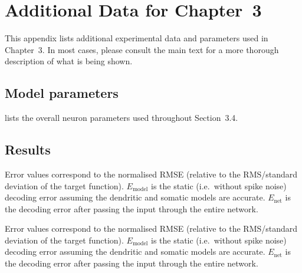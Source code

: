\section{Additional Data for Chapter~3}

This appendix lists additional experimental data and parameters used in Chapter~3.
In most cases, please consult the main text for a more thorough description of what is being shown.

\subsection{Model parameters}

 lists the overall neuron parameters used throughout Section~3.4.




\subsection{Results}
\label{app:two_comp_lif_results}

Error values correspond to the normalised RMSE (relative to the RMS/standard deviation of the target function). $E_\mathrm{model}$ is the static (i.e.~without spike noise) decoding error assuming the dendritic and somatic models are accurate. $E_\mathrm{net}$ is the decoding error after passing the input through the entire network.

Error values correspond to the normalised RMSE (relative to the RMS/standard deviation of the target function). $E_\mathrm{model}$ is the static (i.e.~without spike noise) decoding error assuming the dendritic and somatic models are accurate. $E_\mathrm{net}$ is the decoding error after passing the input through the entire network.





